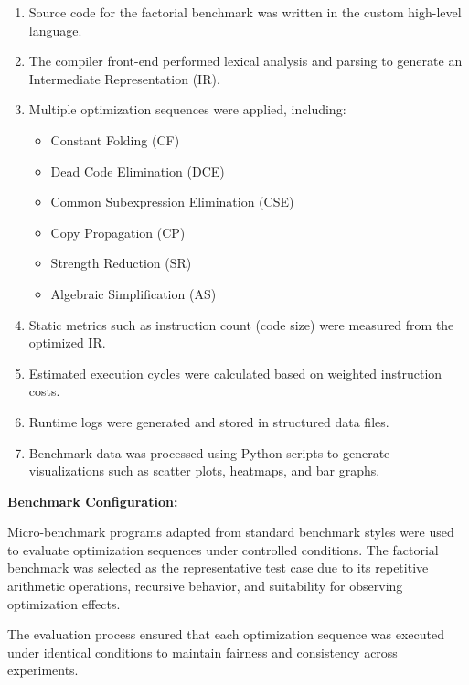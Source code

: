 \documentclass[conference]{IEEEtran}
\begin{document}
\begin{enumerate}

\item Source code for the factorial benchmark was written in the custom high-level language.

\item The compiler front-end performed lexical analysis and parsing to generate an Intermediate Representation (IR).

\item Multiple optimization sequences were applied, including:
    \begin{itemize}
        \item Constant Folding (CF)
        \item Dead Code Elimination (DCE)
        \item Common Subexpression Elimination (CSE)
        \item Copy Propagation (CP)
        \item Strength Reduction (SR)
        \item Algebraic Simplification (AS)
    \end{itemize}

\item Static metrics such as instruction count (code size) were measured from the optimized IR.

\item Estimated execution cycles were calculated based on weighted instruction costs.

\item Runtime logs were generated and stored in structured data files.

\item Benchmark data was processed using Python scripts to generate visualizations such as scatter plots, heatmaps, and bar graphs.

\end{enumerate}

\textbf{Benchmark Configuration:}

Micro-benchmark programs adapted from standard benchmark styles were used to evaluate optimization sequences under controlled conditions. The factorial benchmark was selected as the representative test case due to its repetitive arithmetic operations, recursive behavior, and suitability for observing optimization effects.

The evaluation process ensured that each optimization sequence was executed under identical conditions to maintain fairness and consistency across experiments.
\end{document}
